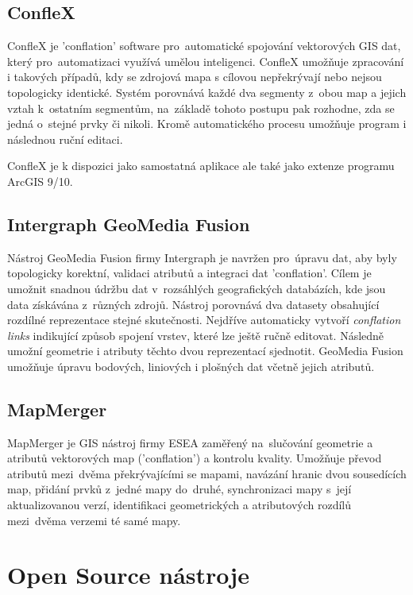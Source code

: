 \subsection{ConfleX}

ConfleX je 'conflation' software pro~automatické spojování vektorových GIS dat, který pro~automatizaci využívá umělou inteligenci. ConfleX umožňuje zpracování i takových 
případů, kdy se zdrojová mapa s cílovou nepřekrývají nebo nejsou topologicky identické. Systém porovnává každé dva segmenty z~obou map a jejich vztah k~ostatním segmentům, 
na~základě tohoto postupu pak rozhodne, zda se jedná o~stejné prvky či nikoli. Kromě automatického procesu umožňuje program i následnou ruční editaci.

ConfleX je k dispozici jako samostatná aplikace ale také jako extenze programu ArcGIS 9/10.

\subsection{Intergraph GeoMedia Fusion}

Nástroj GeoMedia Fusion firmy Intergraph je navržen pro~úpravu dat, aby byly topologicky korektní, validaci atributů a integraci dat 'conflation'. Cílem je umožnit snadnou 
údržbu dat v~rozsáhlých geografických databázích, kde jsou data získávána z~různých zdrojů. Nástroj porovnává dva datasety obsahující rozdílné reprezentace stejné skutečnosti.
Nejdříve automaticky vytvoří \textit{conflation links} indikující způsob spojení vrstev, které lze ještě ručně editovat. Následně umožní geometrie i atributy těchto dvou 
reprezentací sjednotit. GeoMedia Fusion umožňuje úpravu bodových, liniových i plošných dat včetně jejich atributů.


\subsection{MapMerger}

MapMerger je GIS nástroj firmy ESEA zaměřený na~slučování geometrie a atributů vektorových map ('conflation') a kontrolu kvality. Umožňuje převod atributů 
mezi~dvěma překrývajícími se mapami, navázání hranic dvou sousedících map, přidání prvků z~jedné mapy do~druhé, synchronizaci mapy s~její aktualizovanou verzí, 
identifikaci geometrických a atributových rozdílů mezi~dvěma verzemi té samé mapy. 

\section{Open Source nástroje}

